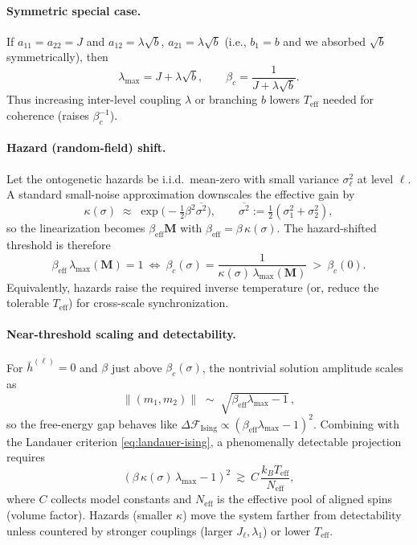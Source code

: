\documentclass[a4paper,11pt]{article}
\begin{document}
\paragraph{Symmetric special case.}
If $a_{11}{=}a_{22}{=}J$ and $a_{12}{=}\lambda\sqrt{b}$, $a_{21}{=}\lambda\sqrt{b}$ (i.e., $b_1{=}b$ and we absorbed $\sqrt{b}$ symmetrically), then
\[
\lambda_{\max}=J+\lambda\sqrt{b},\qquad
\beta_c=\frac{1}{J+\lambda\sqrt{b}}.
\]
Thus increasing inter-level coupling $\lambda$ or branching $b$ lowers $T_{\mathrm{eff}}$ needed for coherence (raises $\beta_c^{-1}$).

\paragraph{Hazard (random-field) shift.}
Let the ontogenetic hazards be i.i.d.\ mean-zero with small variance $\sigma_\ell^2$ at level $\ell$. A standard small-noise approximation downscales the effective gain by
\[
\kappa(\sigma)\;\approx\;\exp\!\Big(-\tfrac{1}{2}\beta^2\overline{\sigma^2}\Big),\qquad
\overline{\sigma^2}:=\tfrac{1}{2}(\sigma_1^2+\sigma_2^2),
\]
so the linearization becomes $\beta_{\mathrm{eff}}\mathbf{M}$ with $\beta_{\mathrm{eff}}=\beta\,\kappa(\sigma)$. The hazard-shifted threshold is therefore
\begin{equation}
\label{eq:l2-hazard-shift}
\beta_{\mathrm{eff}}\,\lambda_{\max}(\mathbf{M})=1
\ \Longleftrightarrow\
\beta_c(\sigma)=\frac{1}{\kappa(\sigma)\,\lambda_{\max}(\mathbf{M})}
\ >\ \beta_c(0).
\end{equation}
Equivalently, hazards raise the required inverse temperature (or, reduce the tolerable $T_{\mathrm{eff}}$) for cross-scale synchronization.

\paragraph{Near-threshold scaling and detectability.}
For $\bar h^{(\ell)}{=}0$ and $\beta$ just above $\beta_c(\sigma)$, the nontrivial solution amplitude scales as
\[
\|(m_1,m_2)\| \;\sim\; \sqrt{\beta_{\mathrm{eff}}\lambda_{\max}-1}\,,
\]
so the free-energy gap behaves like
$\Delta\mathcal{F}_{\mathrm{Ising}}\propto(\beta_{\mathrm{eff}}\lambda_{\max}-1)^2$.
Combining with the Landauer criterion \eqref{eq:landauer-ising}, a phenomenally
detectable projection requires
\[
(\beta\,\kappa(\sigma)\,\lambda_{\max}-1)^2 \ \gtrsim\ C\,\frac{k_B T_{\mathrm{eff}}}{N_{\mathrm{eff}}},
\]
where $C$ collects model constants and $N_{\mathrm{eff}}$ is the effective pool of aligned spins (volume factor). Hazards (smaller $\kappa$) move the system farther from detectability unless countered by stronger couplings (larger $J_\ell,\lambda_1$) or lower $T_{\mathrm{eff}}$.
\end{document}
